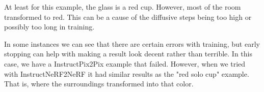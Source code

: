 \documentclass{article}
\begin{document}
\begin{center}
\begin{tcolorbox}
    \end{tcolorbox}
    \begin{tcolorbox}
        At least for this example, the glass is a red cup. However, most of the room transformed to red. This can be a cause of the diffusive steps being too high or possibly too long in training.
    \end{tcolorbox}
\end{center}

\newpage
In some instances we can see that there are certain errors with training, but early stopping can help with making a result look decent rather than terrible. In this case, we have a InstructPix2Pix example that failed. However, when we tried with InstructNeRF2NeRF it had similar results as the "red solo cup" example. That is, where the surroundings transformed into that color.
\end{document}

